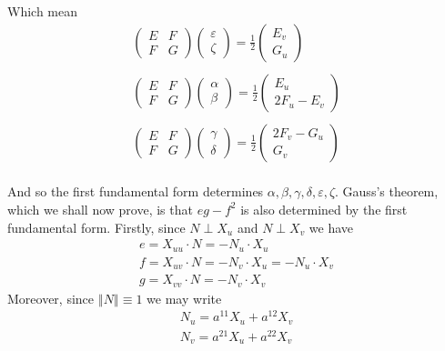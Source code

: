 \documentclass[english]{article}
\def\hlf{\frac{1}{2}}
\newcommand\norm[1]{\left\Vert {#1}\right\Vert }
\def\eps{\varepsilon}
\begin{document}
Which mean
$$\begin{array}{c}
\left(\begin{array}{cc}
E & F\\
F & G
\end{array}\right)\left(\begin{array}{c}
\eps\\
\zeta
\end{array}\right)=\hlf\left(\begin{array}{c}
E_{v}\\
G_{u}
\end{array}\right)\\\\
\left(\begin{array}{cc}
E & F\\
F & G
\end{array}\right)\left(\begin{array}{c}
\alpha\\
\beta
\end{array}\right)=\hlf\left(\begin{array}{c}
E_{u}\\
2F_{u}-E_{v}
\end{array}\right)\\\\
\left(\begin{array}{cc}
E & F\\
F & G
\end{array}\right)\left(\begin{array}{c}
\gamma\\
\delta
\end{array}\right)=\hlf\left(\begin{array}{c}
2F_{v}-G_{u}\\
G_{v}
\end{array}\right)
\end{array}$$\\
And so the first fundamental form determines $\alpha,\beta,\gamma,\delta,\eps,\zeta$. Gauss's theorem, which we shall now prove, is that $eg-f^2$ is also determined by the first fundamental form. Firstly, since $N\perp X_u$ and $N\perp X_v$ we have 
$$\begin{array}{c}
e=X_{uu}\cdot N=-N_{u}\cdot X_{u}\\
f=X_{uv}\cdot N=-N_{v}\cdot X_{u}=-N_{u}\cdot X_{v}\\
g=X_{vv}\cdot N=-N_{v}\cdot X_{v}
\end{array}$$
Moreover, since $\norm{N}\equiv 1$ we may write 
$$\begin{array}{c}
N_{u}=a^{11}X_{u}+a^{12}X_{v}\\
N_{v}=a^{21}X_{u}+a^{22}X_{v}
\end{array}$$\\
\end{document}
